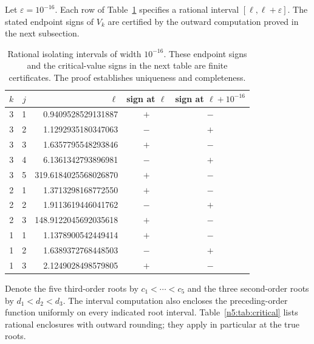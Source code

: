 Let $\varepsilon=10^{-16}$.  Each row of
Table~\ref{n5:tab:roots} specifies a rational interval
$[\ell,\ell+\varepsilon]$.  The stated endpoint signs of $V_k$ are
certified by the outward computation proved in the next subsection.

\begin{table}[htbp]
\centering
\small
\begin{tabular}{ccrcc}
\toprule
$k$&$j$&$\ell$&sign at $\ell$&sign at $\ell+10^{-16}$\\
\midrule
3&1&0.9409528529131887&$+$&$-$\\
3&2&1.1292935180347063&$-$&$+$\\
3&3&1.6357795548293846&$+$&$-$\\
3&4&6.1361342793896981&$-$&$+$\\
3&5&319.6184025568026870&$+$&$-$\\
\midrule
2&1&1.3713298168772550&$+$&$-$\\
2&2&1.9113619446041762&$-$&$+$\\
2&3&148.9122045692035618&$+$&$-$\\
\midrule
1&1&1.1378900542449414&$+$&$-$\\
1&2&1.6389372768448503&$-$&$+$\\
1&3&2.1249028498579805&$+$&$-$\\
\bottomrule
\end{tabular}
\caption{Rational isolating intervals of width $10^{-16}$.  These
endpoint signs and the critical-value signs in the next table are finite
certificates.  The proof establishes uniqueness and completeness.}
\label{n5:tab:roots}
\end{table}

Denote the five third-order roots by $c_1<\cdots<c_5$ and the three
second-order roots by $d_1<d_2<d_3$.  The interval computation also
encloses the preceding-order function uniformly on every indicated
root interval.  Table~\ref{n5:tab:critical} lists rational enclosures
with outward rounding; they apply in particular at the true roots.

